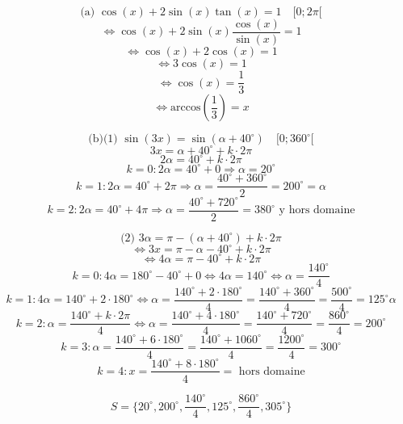 \documentclass{article}
\begin{document}
\[ \text{(a) } \cos(x) + 2\sin(x)\tan(x) = 1 \quad [0; 2\pi[ \]
\[ \Leftrightarrow \cos(x) + 2\sin(x) \frac{\cos(x)}{\sin(x)} = 1 \]
\[ \Leftrightarrow \cos(x) + 2\cos(x) = 1 \]
\[ \Leftrightarrow 3\cos(x) = 1 \]
\[ \Leftrightarrow \cos(x) = \frac{1}{3} \]
\[ \Leftrightarrow \text{arccos}(\frac{1}{3}) = x \]

\[ \text{(b)(1) } \sin(3x) = \sin(\alpha+40^\circ) \quad [0; 360^\circ[ \]
\[ 3x = \alpha + 40^\circ + k \cdot 2\pi \]
\[ 2\alpha = 40^\circ + k \cdot 2\pi \]
\[ k=0: 2\alpha = 40^\circ + 0 \Rightarrow \alpha = 20^\circ \]
\[ k=1: 2\alpha = 40^\circ + 2\pi \Rightarrow \alpha = \frac{40^\circ + 360^\circ}{2} = 200^\circ = \alpha \]
\[ k=2: 2\alpha = 40^\circ + 4\pi \Rightarrow \alpha = \frac{40^\circ + 720^\circ}{2} = 380^\circ \text{ y hors domaine} \]

\[ \text{(2) } 3\alpha = \pi - (\alpha+40^\circ) + k \cdot 2\pi \]
\[ \Leftrightarrow 3x = \pi - \alpha - 40^\circ + k \cdot 2\pi \]
\[ \Leftrightarrow 4\alpha = \pi - 40^\circ + k \cdot 2\pi \]
\[ k=0: 4\alpha = 180^\circ - 40^\circ + 0 \Leftrightarrow 4\alpha = 140^\circ \Leftrightarrow \alpha = \frac{140^\circ}{4} \]
\[ k=1: 4\alpha = 140^\circ + 2 \cdot 180^\circ \Leftrightarrow \alpha = \frac{140^\circ + 2 \cdot 180^\circ}{4} = \frac{140^\circ + 360^\circ}{4} = \frac{500^\circ}{4} = 125^\circ \alpha \]
\[ k=2: \alpha = \frac{140^\circ + k \cdot 2\pi}{4} \Leftrightarrow \alpha = \frac{140^\circ + 4 \cdot 180^\circ}{4} = \frac{140^\circ + 720^\circ}{4} = \frac{860^\circ}{4} = 200^\circ \]
\[ k=3: \alpha = \frac{140^\circ + 6 \cdot 180^\circ}{4} = \frac{140^\circ + 1060^\circ}{4} = \frac{1200^\circ}{4} = 300^\circ \]
\[ k=4: x = \frac{140^\circ + 8 \cdot 180^\circ}{4} = \text{ hors domaine} \]

\[ S = \{20^\circ, 200^\circ, \frac{140^\circ}{4}, 125^\circ, \frac{860^\circ}{4}, 305^\circ\} \]
\end{document}
